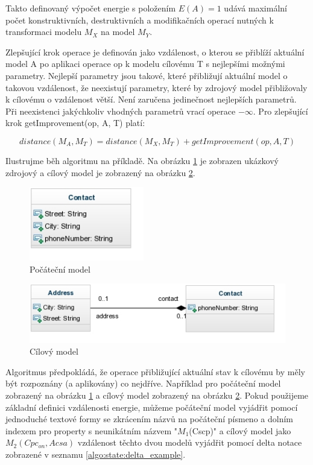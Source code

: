 \documentclass[11pt,twoside,a4paper]{book}
\begin{document}
Takto definovaný výpočet energie s položením $E(A) = 1$ udává maximální počet
konstruktivních, destruktivních a modifikačních operací nutných k transformaci
modelu $M_X$ na model $M_Y$.

Zlepšující krok operace je definován jako vzdálenost, o kterou se přiblíží
aktuální model A po aplikaci operace op k modelu cílovému T s nejlepšími
možnými parametry. Nejlepší parametry jsou takové, které přibližují
aktuální model o takovou vzdálenost, že neexistují parametry, které by zdrojový
model přibližovaly k cílovému o vzdálenost větší. Není zaručena jedinečnost
nejlepších parametrů. Při neexistenci jakýchkoliv vhodných parametrů
vrací operace $-\infty$. Pro zlepšující krok getImprovement(op, A, T) platí:

$$distance(M_A, M_T) = distance(M_X, M_T) + getImprovement(op, A, T)$$

Ilustrujme běh algoritmu na příkladě. Na obrázku \ref{fig:exp_contact} je
zobrazen ukázkový zdrojový a cílový model je zobrazený na obrázku
\ref{fig:exp_contact_address}.

\begin{figure}[H]
\begin{center}
\includegraphics[width=5cm]{figures/exp_contact.jpg}
\caption{Počáteční model}
\label{fig:exp_contact}
\end{center}
\end{figure}

\begin{figure}[H]
\begin{center}
\includegraphics[width=12cm]{figures/exp_contact_address.jpg}
\caption{Cílový model}
\label{fig:exp_contact_address}
\end{center}
\end{figure}

\FloatBarrier

Algoritmus předpokládá, že operace přibližující aktuální stav k cílovému by
měly být rozpoznány (a aplikovány) co nejdříve. Například pro počáteční model
zobrazený na obrázku \ref{fig:exp_contact} a cílový model zobrazený na obrázku
\ref{fig:exp_contact_address}. 
Pokud použijeme základní definici vzdálenosti energie, můžeme
počáteční model vyjádřit pomocí jednoduché textové formy se
zkrácením názvů na počáteční písmeno a dolním indexem pro
property s neunikátním názvem "$M_1$(Cscp)" a cílový model jako $M_2(Cpc_{on},
Acsa)$ vzdálenost těchto dvou modelů vyjádřit pomocí
 delta notace zobrazené v seznamu \ref{algo:state:delta_example}.
 
\end{document}
